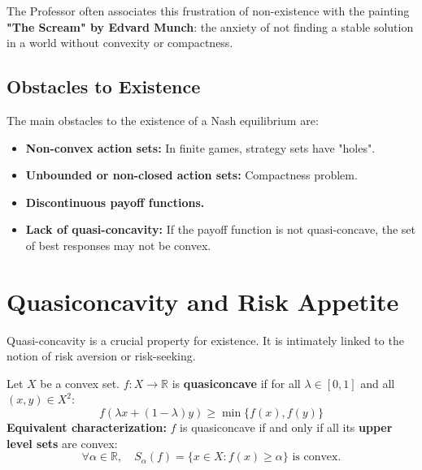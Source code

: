 \begin{remarque}
The Professor often associates this frustration of non-existence with the painting \textbf{"The Scream" by Edvard Munch}: the anxiety of not finding a stable solution in a world without convexity or compactness.
\end{remarque}

\subsection{Obstacles to Existence}
The main obstacles to the existence of a Nash equilibrium are:
\begin{itemize}
    \item \textbf{Non-convex action sets:} In finite games, strategy sets have "holes".
    \item \textbf{Unbounded or non-closed action sets:} Compactness problem.
    \item \textbf{Discontinuous payoff functions.}
    \item \textbf{Lack of quasi-concavity:} If the payoff function is not quasi-concave, the set of best responses may not be convex.
\end{itemize}

\section{Quasiconcavity and Risk Appetite}

Quasi-concavity is a crucial property for existence. It is intimately linked to the notion of risk aversion or risk-seeking.

\begin{definition}[Quasiconcavity]
Let $X$ be a convex set. $f: X \rightarrow \mathbb{R}$ is \textbf{quasiconcave} if for all $\lambda \in [0,1]$ and all $(x, y) \in X^2$:
$$f(\lambda x + (1-\lambda)y) \ge \min\{f(x), f(y)\}$$
\textbf{Equivalent characterization:} $f$ is quasiconcave if and only if all its \textbf{upper level sets} are convex:
$$\forall \alpha \in \mathbb{R}, \quad S_{\alpha}(f) = \{x \in X : f(x) \ge \alpha\} \text{ is convex.}$$
\end{definition}

